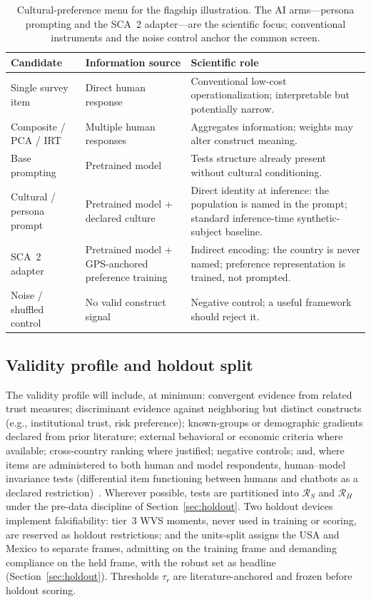\documentclass[10pt,letterpaper]{article}
\newcommand{\Rset}{\mathcal{R}}
\begin{document}
\begin{table}[t]
\centering
\small
\caption{Cultural-preference menu for the flagship illustration.
The AI arms---persona prompting and the SCA~2 adapter---are the scientific focus; conventional instruments and the noise control anchor the common screen.}
\label{tab:trustmenu}
\begin{tabularx}{\textwidth}{@{}>{\raggedright\arraybackslash}p{2.6cm} >{\raggedright\arraybackslash}p{3.4cm} X@{}}
\toprule
\textbf{Candidate} & \textbf{Information source} & \textbf{Scientific role} \\
\midrule
Single survey item & Direct human response & Conventional low-cost operationalization; interpretable but potentially narrow. \\
Composite / PCA / IRT & Multiple human responses & Aggregates information; weights may alter construct meaning. \\
Base prompting & Pretrained model & Tests structure already present without cultural conditioning. \\
Cultural / persona prompt & Pretrained model + declared culture & Direct identity at inference: the population is named in the prompt; standard inference-time synthetic-subject baseline. \\
SCA~2 adapter & Pretrained model + GPS-anchored preference training & Indirect encoding: the country is never named; preference representation is trained, not prompted. \\
Noise / shuffled control & No valid construct signal & Negative control; a useful framework should reject it. \\
\bottomrule
\end{tabularx}
\end{table}

\subsection{Validity profile and holdout split}
The validity profile will include, at minimum:
convergent evidence from related trust measures;
discriminant evidence against neighboring but distinct constructs (e.g., institutional trust, risk preference);
known-groups or demographic gradients declared from prior literature;
external behavioral or economic criteria where available;
cross-country ranking where justified;
negative controls;
and, where items are administered to both human and model respondents, human--model invariance tests (differential item functioning between humans and chatbots as a declared restriction)~\cite{zeinfeld2026}.
Wherever possible, tests are partitioned into $\Rset_S$ and $\Rset_H$ under the pre-data discipline of Section~\ref{sec:holdout}.
Two holdout devices implement falsifiability: tier~3 WVS moments, never used in training or scoring, are reserved as holdout restrictions; and the units-split assigns the USA and Mexico to separate frames, admitting on the training frame and demanding compliance on the held frame, with the robust set as headline (Section~\ref{sec:holdout}).
Thresholds $\tau_r$ are literature-anchored and frozen before holdout scoring.
\end{document}
